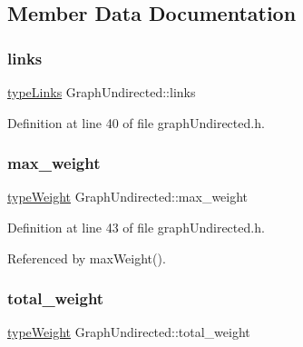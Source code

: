 \subsection{Member Data Documentation}
\mbox{\label{classGraphUndirected_a9325f02f5d038919f3d5db197da83214}} 
\subsubsection{\texorpdfstring{links}{links}}
{\footnotesize\ttfamily \hyperlink{graphInterface_8h_a31ca98f3d40433c4c9e20fe8901d4392}{type\+Links} Graph\+Undirected\+::links\hspace{0.3cm}{\ttfamily [private]}}



Definition at line 40 of file graph\+Undirected.\+h.

\mbox{\label{classGraphUndirected_a192e23963095ecfe1b327ba188a26bee}} 
\subsubsection{\texorpdfstring{max\+\_\+weight}{max\_weight}}
{\footnotesize\ttfamily \hyperlink{edge_8h_a2e7ea3be891ac8b52f749ec73fee6dd2}{type\+Weight} Graph\+Undirected\+::max\+\_\+weight\hspace{0.3cm}{\ttfamily [private]}}



Definition at line 43 of file graph\+Undirected.\+h.



Referenced by max\+Weight().

\mbox{\label{classGraphUndirected_a713f460aba5e5ee4d3079f5df25fe14d}} 
\subsubsection{\texorpdfstring{total\+\_\+weight}{total\_weight}}
{\footnotesize\ttfamily \hyperlink{edge_8h_a2e7ea3be891ac8b52f749ec73fee6dd2}{type\+Weight} Graph\+Undirected\+::total\+\_\+weight\hspace{0.3cm}{\ttfamily [private]}}



